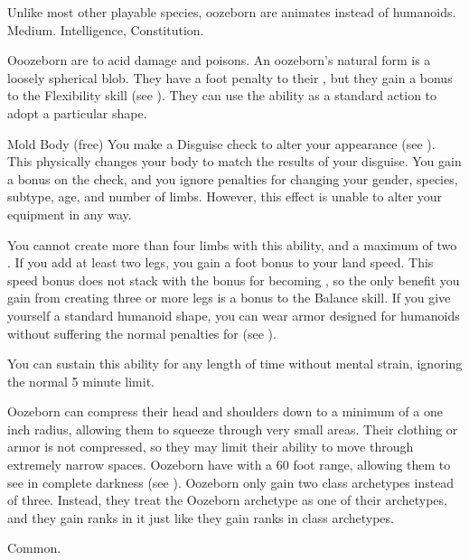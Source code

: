          Unlike most other playable species, oozeborn are animates instead of humanoids.
         Medium.
          Intelligence,  Constitution.
        \begin{itemize}
             Ooozeborn are  to acid damage and poisons.
             An oozeborn's natural form is a loosely spherical blob.
                They have a  foot penalty to their , but they gain a  bonus to the Flexibility skill (see ).
                They can use the  ability as a standard action to adopt a particular shape.
                \begin{sustainability}{Mold Body}{ (free)}
                    \rankline
                    You make a Disguise check to alter your appearance (see ).
                    This physically changes your body to match the results of your disguise.
                    You gain a  bonus on the check, and you ignore penalties for changing your gender, species, subtype, age, and number of limbs.
                    However, this effect is unable to alter your equipment in any way.

                    You cannot create more than four limbs with this ability, and a maximum of two .
                    If you add at least two legs, you gain a  foot bonus to your land speed.
                    This speed bonus does not stack with the bonus for becoming , so the only benefit you gain from creating three or more legs is a  bonus to the Balance skill.
                    If you give yourself a standard humanoid shape, you can wear armor designed for humanoids without suffering the normal penalties for  (see ).

                    You can sustain this ability for any length of time without mental strain, ignoring the normal 5 minute limit.
                \end{sustainability}
             Oozeborn can compress their head and shoulders down to a minimum of a one inch radius, allowing them to squeeze through very small areas.
                Their clothing or armor is not compressed, so they may limit their ability to move through extremely narrow spaces.
             Oozeborn have  with a 60 foot range, allowing them to see in complete darkness (see ).
             Oozeborn only gain two class archetypes instead of three.
                Instead, they treat the Oozeborn archetype as one of their archetypes, and they gain ranks in it just like they gain ranks in class archetypes.
        \end{itemize}
         Common.
        
